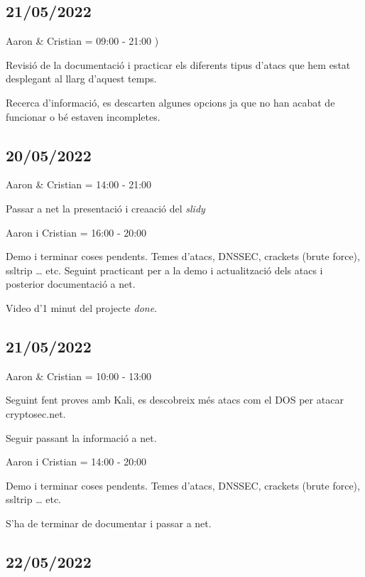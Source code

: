 \documentclass[]{article}
\begin{document}
\hypertarget{section-20}{%
\subsection{21/05/2022}\label{section-20}}

Aaron \& Cristian = 09:00 - 21:00 )

Revisió de la documentació i practicar els diferents tipus d'atacs que
hem estat desplegant al llarg d'aquest temps.

Recerca d'informació, es descarten algunes opcions ja que no han acabat
de funcionar o bé estaven incompletes.

\hypertarget{section-21}{%
\subsection{20/05/2022}\label{section-21}}

Aaron \& Cristian = 14:00 - 21:00

Passar a net la presentació i creaació del \emph{slidy}

Aaron i Cristian = 16:00 - 20:00

Demo i terminar coses pendents. Temes d'atacs, DNSSEC, crackets (brute
force), ssltrip \ldots{} etc. Seguint practicant per a la demo i
actualització dels atacs i posterior documentació a net.

Video d'1 minut del projecte \emph{done}.

\hypertarget{section-22}{%
\subsection{21/05/2022}\label{section-22}}

Aaron \& Cristian = 10:00 - 13:00

Seguint fent proves amb Kali, es descobreix més atacs com el DOS per
atacar cryptosec.net.

Seguir passant la informació a net.

Aaron i Cristian = 14:00 - 20:00

Demo i terminar coses pendents. Temes d'atacs, DNSSEC, crackets (brute
force), ssltrip \ldots{} etc.

S'ha de terminar de documentar i passar a net.

\hypertarget{section-23}{%
\subsection{22/05/2022}\label{section-23}}
\end{document}
